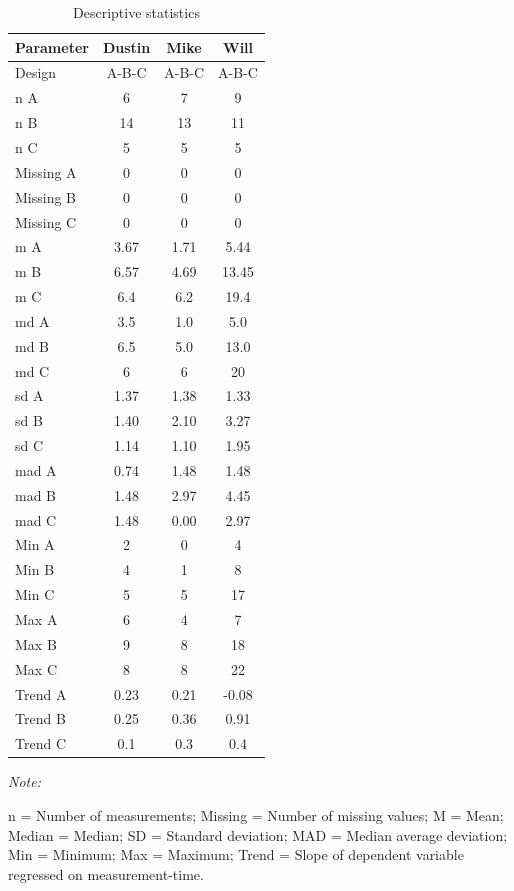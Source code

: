\documentclass[
]{book}
\begin{document}
\begin{table}[!h]

\caption{\label{tab:describe-strange-study}Descriptive statistics}
\begin{threeparttable}
\begin{tabular}[t]{lccc}
\toprule
Parameter & Dustin & Mike & Will\\
\midrule
Design & A-B-C & A-B-C & A-B-C\\
n A & 6 & 7 & 9\\
n B & 14 & 13 & 11\\
n C & 5 & 5 & 5\\
Missing A & 0 & 0 & 0\\
Missing B & 0 & 0 & 0\\
Missing C & 0 & 0 & 0\\
m A & 3.67 & 1.71 & 5.44\\
m B & 6.57 & 4.69 & 13.45\\
m C & 6.4 & 6.2 & 19.4\\
md A & 3.5 & 1.0 & 5.0\\
md B & 6.5 & 5.0 & 13.0\\
md C & 6 & 6 & 20\\
sd A & 1.37 & 1.38 & 1.33\\
sd B & 1.40 & 2.10 & 3.27\\
sd C & 1.14 & 1.10 & 1.95\\
mad A & 0.74 & 1.48 & 1.48\\
mad B & 1.48 & 2.97 & 4.45\\
mad C & 1.48 & 0.00 & 2.97\\
Min A & 2 & 0 & 4\\
Min B & 4 & 1 & 8\\
Min C & 5 & 5 & 17\\
Max A & 6 & 4 & 7\\
Max B & 9 & 8 & 18\\
Max C & 8 & 8 & 22\\
Trend A & 0.23 & 0.21 & -0.08\\
Trend B & 0.25 & 0.36 & 0.91\\
Trend C & 0.1 & 0.3 & 0.4\\
\bottomrule
\end{tabular}
\begin{tablenotes}
\item \textit{Note: } 
\item n = Number of measurements; Missing = Number of missing values; M = Mean; Median = Median; SD = Standard deviation; MAD = Median average deviation; Min = Minimum; Max = Maximum; Trend = Slope of dependent variable regressed on measurement-time.
\end{tablenotes}
\end{threeparttable}
\end{table}
\end{document}
